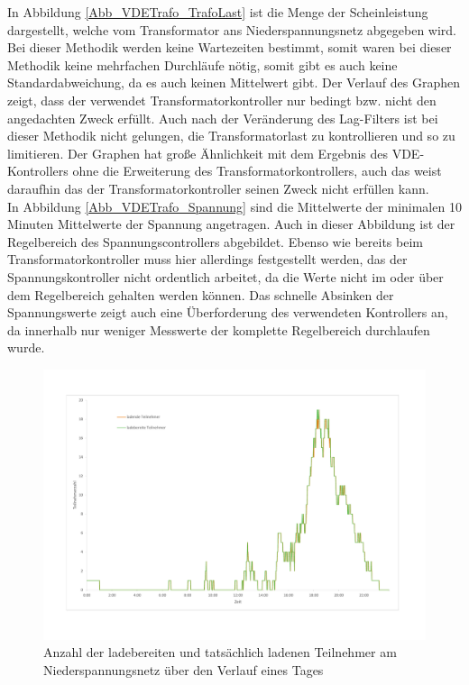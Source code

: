 In Abbildung \ref{Abb_VDETrafo_TrafoLast} ist die Menge der Scheinleistung dargestellt, welche vom Transformator ans Niederspannungsnetz abgegeben wird. Bei dieser Methodik werden keine Wartezeiten bestimmt, somit waren bei dieser Methodik keine mehrfachen Durchläufe nötig, somit gibt es auch keine Standardabweichung, da es auch keinen Mittelwert gibt. Der Verlauf des Graphen zeigt, dass der verwendet Transformatorkontroller nur bedingt bzw. nicht den angedachten Zweck erfüllt. Auch nach der Veränderung des Lag-Filters ist bei dieser Methodik nicht gelungen, die Transformatorlast zu kontrollieren und so zu limitieren. Der Graphen hat große Ähnlichkeit mit dem Ergebnis des VDE-Kontrollers ohne die Erweiterung des Transformatorkontrollers, auch das weist daraufhin das der Transformatorkontroller seinen Zweck nicht erfüllen kann. \\
In Abbildung \ref{Abb_VDETrafo_Spannung} sind die Mittelwerte der minimalen 10 Minuten Mittelwerte der Spannung angetragen. Auch in dieser Abbildung ist der Regelbereich des Spannungscontrollers abgebildet. Ebenso wie bereits beim Transformatorkontroller muss hier allerdings festgestellt werden, das der Spannungskontroller nicht ordentlich arbeitet, da die Werte nicht im oder über dem Regelbereich gehalten werden können. Das schnelle Absinken der Spannungswerte zeigt auch eine Überforderung des verwendeten Kontrollers an, da innerhalb nur weniger Messwerte der komplette Regelbereich durchlaufen wurde.\\
\begin{figure}[htb]
\centering
	\includegraphics[scale=0.5]{img/VDE_tau_trafo/Teilnehmer2.pdf}
	\caption{Anzahl der ladebereiten und tatsächlich ladenen Teilnehmer am Niederspannungsnetz über den Verlauf eines Tages}
	\label{Abb_VDETrafo_Teilnehmer}
\end{figure}

